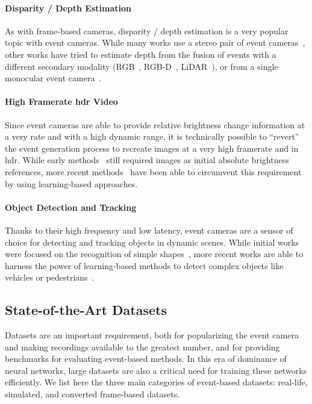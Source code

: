 \paragraph{Disparity / Depth Estimation}
As with frame-based cameras, disparity / depth estimation is a very popular topic with event cameras. While many works use a stereo pair of event cameras~\cite{Schraml2010DynamicSV,Schraml2016AnES,Nam2022StereoDF}, other works have tried to estimate depth from the fusion of events with a different secondary modality (RGB~\cite{Gehrig2021CombiningEA}, RGB-D~\cite{Weikersdorfer2014Eventbased3S}, LiDAR~\cite{Li2021Enhancing3L,Cui2022DenseDE}), or from a single monocular event camera~\cite{Zhu2019UnsupervisedEL,Kim2016RealTime3R,HidalgoCarrio2020LearningMD}.

\paragraph{High Framerate \acrshort{hdr} Video}
Since event cameras are able to provide relative brightness change information at a very rate and with a high dynamic range, it is technically possible to ``revert'' the event generation process to recreate images at a very high framerate and in \acrshort{hdr}. While early methods~\cite{Scheerlinck2018ContinuoustimeIE} still required images as initial absolute brightness references, more recent methods~\cite{ParedesValls2021BackTE,Yu2022LearningTS,Ercan2023HyperE2VIDIE} have been able to circumvent this requirement by using learning-based approaches.

\paragraph{Object Detection and Tracking}
Thanks to their high frequency and low latency, event cameras are a sensor of choice for detecting and tracking objects in dynamic scenes. While initial works were focused on the recognition of simple shapes~\cite{SerranoGotarredona2009CAVIARA4,Wiesmann2012EventdrivenES}, more recent works are able to harness the power of learning-based methods to detect complex objects like vehicles or pedestrians~\cite{Perot2020LearningTD,Sironi2018HATSHO,Gehrig2022RecurrentVT}.


\subsection{State-of-the-Art Datasets}\label{sec:evtcams:sota:datasets}
Datasets are an important requirement, both for popularizing the event camera and making recordings available to the greatest number, and for providing benchmarks for evaluating event-based methods. In this era of dominance of neural networks, large datasets are also a critical need for training these networks efficiently. We list here the three main categories of event-based datasets: real-life, simulated, and converted frame-based datasets.

